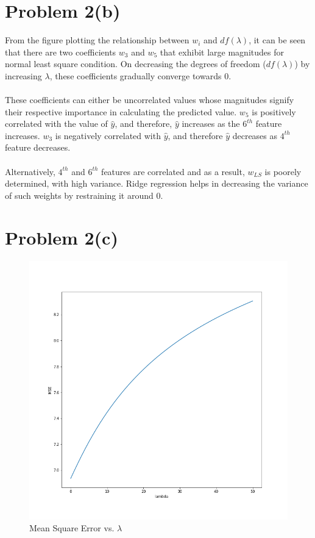 \documentclass[openany,11pt]{homework}
\begin{document}
\section*{Problem 2(b)}
From the figure plotting the relationship between $w_i$ and $df(\lambda)$, it can be seen that there are two coefficients $w_3$ and $w_5$ that exhibit large magnitudes for normal least square condition. On decreasing the degrees of freedom ($df(\lambda)$) by increasing $\lambda$, these coefficients gradually converge towards 0.
\\
\\
These coefficients can either be uncorrelated values whose magnitudes signify their respective importance in calculating the predicted value. $w_5$ is positively correlated with the value of $\hat{y}$, and therefore, $\hat{y}$ increases as the $6^{th}$ feature increases. $w_3$ is negatively correlated with $\hat{y}$, and therefore $\hat{y}$ decreases as $4^{th}$ feature decreases.
\\
\\
Alternatively, $4^{th}$ and $6^{th}$ features are correlated and as a result, $w_{LS}$ is poorely determined, with high variance. Ridge regression helps in decreasing the variance of such weights by restraining it around 0.

\section*{Problem 2(c)}
\begin{figure}[h]
	\includegraphics[width=\textwidth]{MSE_vs_lambda}
	\caption{Mean Square Error vs. $\lambda$}
\end{figure}
\end{document}
